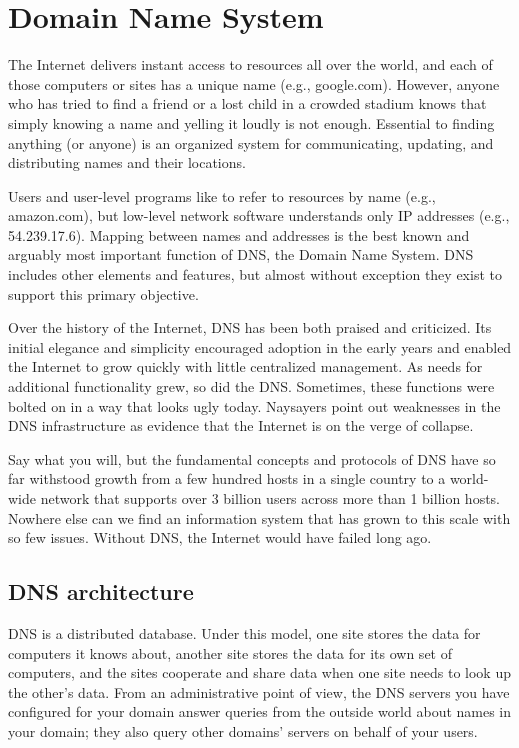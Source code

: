 \chapter{Domain Name System}
\label{chap:dns}

The Internet delivers instant access to resources all over the world,
and each of those computers or sites has a unique name (e.g.,
google.com). However, anyone who has tried to find a friend or a lost
child in a crowded stadium knows that simply knowing a name and yelling
it loudly is not enough. Essential to finding anything (or anyone) is an
organized system for communicating, updating, and distributing names and
their locations.

\protect\hypertarget{part0024_split_000.htmlux5cux23_idIndexMarker1967}{}{}Users
and user-level programs like to refer to resources by name (e.g.,
amazon.com), but low-level network software understands only IP
addresses (e.g., 54.239.17.6). Mapping between names and addresses is
the best known and arguably most important function of DNS, the Domain
Name System. DNS includes other elements and features, but almost
without exception they exist to support this primary objective.

Over the history of the Internet, DNS has been both praised and
criticized. Its initial elegance and simplicity encouraged adoption in
the early years and enabled the Internet to grow quickly with little centralized management.
As needs for additional functionality grew, so did the DNS.
Sometimes, these functions were bolted on in a way that looks ugly today.
Naysayers point out weaknesses in the DNS infrastructure as evidence that the Internet is on the verge of collapse.

Say what you will, but the fundamental concepts and protocols of DNS
have so far withstood growth from a few hundred hosts in a single
country to a world-wide network that supports over 3 billion users
across more than 1 billion hosts. Nowhere else can we find an
information system that has grown to this scale with so few issues.
Without DNS, the Internet would have failed long ago.



\section{DNS architecture}

DNS is a distributed database.
Under this model, one site stores the data for computers it knows about, another site stores the data for its own set of computers,
and the sites cooperate and share data when one site needs to look up the other's data.
From an administrative point of view, the DNS servers you have configured for your domain answer queries from
the outside world about names in your domain; they also query other domains' servers on behalf of your users.


